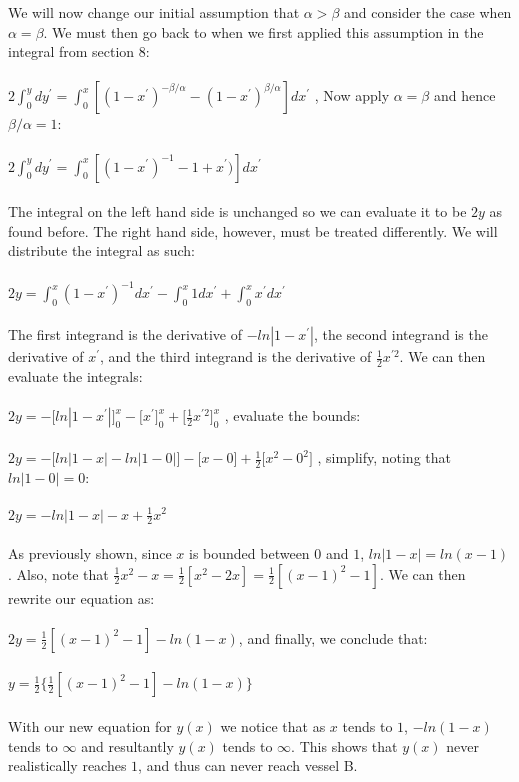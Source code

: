 \documentclass[12pt]{article}
\begin{document}
	\indent \indent We will now change our initial assumption that $\alpha>\beta$ and consider the case when $\alpha=\beta$. We must then go back to when we first applied this assumption in the integral from section 8: 
	\\
	\\
	$2${\Large $\int^y_0$}$dy^{\prime}=${\Large $\int^x_0$}$[(1-x^{\prime})^{-\beta/\alpha}-(1-x^{\prime})^{\beta/\alpha}]dx^{\prime}$ \hspace{1cm} , Now apply $\alpha=\beta$ and hence $\beta/\alpha=1$:
	\\
	\\
	$2${\Large $\int^y_0$}$dy^{\prime}=${\Large $\int^x_0$}$[(1-x^{\prime})^{-1}-1+x^{\prime})]dx^{\prime}$
	\\
	\\
	\indent The integral on the left hand side is unchanged so we can evaluate it to be $2y$ as found before. The right hand side, however, must be treated differently. We will distribute the integral as such:
	\\
	\\
	$2y=${\Large $\int^x_0$}$(1-x^{\prime})^{-1}dx^{\prime}-${\Large $\int^x_0$}$1dx^{\prime}+${\Large $\int^x_0$}$x^{\prime}dx^{\prime}$
	\\
	\\
	\indent The first integrand is the derivative of $-ln|1-x^{\prime}|$, the second integrand is the derivative of $x^{\prime}$, and the third integrand is the derivative of $\frac{1}{2}x^{\prime 2}$. We can then evaluate the integrals:
	\\
	\\
	$2y=-\bigg[ln|1-x^{\prime}|\bigg]^x_0-\bigg[x^{\prime}\bigg]^x_0+\bigg[\frac{1}{2}x^{\prime 2}\bigg]^x_0$ \hspace{3.8cm} , evaluate the bounds:
	\\
	\\
	$2y=-\bigg[ln|1-x|-ln|1-0|\bigg]-\bigg[x-0\bigg]+\frac{1}{2}\bigg[x^{2}-0^{2}\bigg]$ \hspace{1cm} , simplify, noting that $ln|1-0|=0$:
	\\
	\\
	$2y=-ln|1-x|-x+\frac{1}{2}x^{2}$
	\\
	\\
	\indent As previously shown, since $x$ is bounded between $0$ and $1$, $ln|1-x|=ln(x-1)$. Also, note that $\frac{1}{2}x^2-x=\frac{1}{2}[x^2-2x]=\frac{1}{2}[(x-1)^2-1]$. We can then rewrite our equation as:
	\\
	\\
	$2y=\frac{1}{2}[(x-1)^2-1]-ln(1-x)$\hspace{1cm}, and finally, we conclude that:
	\\
	\\
	$y=\frac{1}{2}\Big\{\frac{1}{2}[(x-1)^2-1]-ln(1-x)\Big\}$
	\\
	\\
	\indent With our new equation for $y(x)$ we notice that as $x$ tends to $1$, $-ln(1-x)$ tends to $\infty$ and resultantly $y(x)$ tends to $\infty$. This shows that $y(x)$ never realistically reaches $1$, and thus can never reach vessel B.  
	
\end{document}
